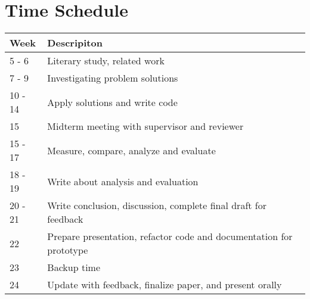 \documentclass[a4paper,11pt,dvipsnames]{article}
\begin{document}
	\section*{Time Schedule}
	\vspace{1.5cm}
	\begin{center}
		\begin{tabular}{ |m{1.5cm}|m{30em} | } 
			\hline
			\textbf{Week} & \textbf{Descripiton}\\
			\hline
			
			5 - 6 & Literary study, related work \\ 
			7 - 9 & Investigating problem solutions \\ 
			10 - 14 & Apply solutions and write code \\
			15 & Midterm meeting with supervisor and reviewer \\ 
			15 - 17 & Measure, compare, analyze and evaluate \\ 
			18 - 19 & Write about analysis and evaluation \\
			20 - 21 & Write conclusion, discussion, complete final draft 
			for feedback \\
			22  & Prepare presentation, refactor code and documentation 
			for prototype \\
			23 & Backup time \\
			24 & Update with feedback, finalize paper, and present orally\\
			
			\hline
		\end{tabular}
	\end{center}
	
	
	
\end{document}
